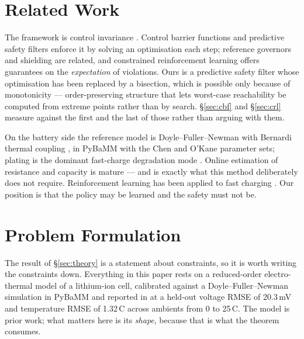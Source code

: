 \documentclass[11pt,letterpaper]{article}
\theoremstyle{definition}
\theoremstyle{remark}
\newcommand{\SI}[2]{#1\,#2}
\newcommand{\degreeCelsius}{\degC}
\newcommand{\degC}{\ifmmode{^\circ}\mathrm{C}\else\textdegree C\fi}
\begin{document}
\section{Related Work}\label{sec:related}

The framework is control invariance \cite{blanchini2008settheoretic}. Control barrier functions
\cite{ames2019cbf} and predictive safety filters \cite{wabersich2021psf} enforce it by solving an
optimisation each step; reference governors \cite{gilbert2002governor} and shielding
\cite{alshiekh2018shielding} are related, and constrained reinforcement learning
\cite{achiam2017cpo,altman1999constrained,stooke2020pid} offers guarantees on the
\emph{expectation} of violations. Ours is a predictive safety filter whose optimisation has been
replaced by a bisection, which is possible only because of monotonicity
\cite{angeli2003monotone,coogan2015mixed} --- order-preserving structure that lets worst-case
reachability be computed from extreme points rather than by search. \S\ref{sec:cbf} and
\S\ref{sec:crl} measure against the first and the last of those rather than arguing with them.

On the battery side the reference model is Doyle--Fuller--Newman \cite{doyle1993,newman2004} with
Bernardi thermal coupling \cite{bernardi1985}, in PyBaMM \cite{sulzer2021pybamm} with the Chen
\cite{chen2020} and O'Kane \cite{okane2022} parameter sets; plating is the dominant fast-charge
degradation mode \cite{yang2017plating}. Online estimation of resistance and capacity is mature
\cite{plett2015,moura2017} --- and is exactly what this method deliberately does not require.
Reinforcement learning has been applied to fast charging \cite{wei2022ddpg,attia2020}. Our
position is that the policy may be learned and the safety must not be.

\section{Problem Formulation}\label{sec:cell}

The result of \S\ref{sec:theory} is a statement about constraints, so it is worth writing the
constraints down. Everything in this paper rests on a reduced-order electro-thermal model of a
lithium-ion cell, calibrated against a Doyle--Fuller--Newman simulation in PyBaMM and reported
in \cite{krishnan2026safe} at a held-out voltage RMSE of 20.3\,mV and temperature RMSE of
\SI{1.32}{\degreeCelsius} across ambients from 0 to \SI{25}{\degreeCelsius}. The model is prior work; what matters here
is its \emph{shape}, because that is what the theorem consumes.
\end{document}
